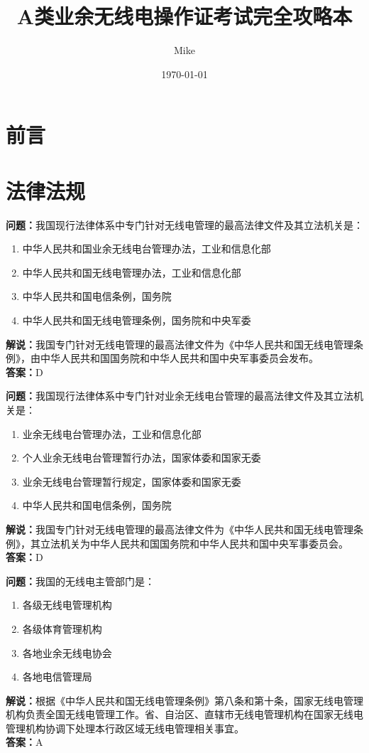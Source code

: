 \documentclass{ctexbook}%
\title{A类业余无线电操作证考试完全攻略本}%
\author{Mike}%
\date{\today}%
\begin{document}

\maketitle%
\tableofcontents%

\chapter*{前言}

\chapter{法律法规}

\textbf{问题：}我国现行法律体系中专门针对无线电管理的最高法律文件及其立法机关是：
\begin{enumerate}[label=\Alph*), leftmargin=3em]
\item 中华人民共和国业余无线电台管理办法，工业和信息化部
\item 中华人民共和国无线电管理办法，工业和信息化部
\item 中华人民共和国电信条例，国务院
\item 中华人民共和国无线电管理条例，国务院和中央军委
\end{enumerate}
\textbf{解说：}我国专门针对无线电管理的最高法律文件为《中华人民共和国无线电管理条例》，由中华人民共和国国务院和中华人民共和国中央军事委员会发布。\\
\textbf{答案：}D

\textbf{问题：}我国现行法律体系中专门针对业余无线电台管理的最高法律文件及其立法机关是：
\begin{enumerate}[label=\Alph*), leftmargin=3em]
\item 业余无线电台管理办法，工业和信息化部
\item 个人业余无线电台管理暂行办法，国家体委和国家无委
\item 业余无线电台管理暂行规定，国家体委和国家无委
\item 中华人民共和国电信条例，国务院
\end{enumerate}
\textbf{解说：}我国专门针对无线电管理的最高法律文件为《中华人民共和国无线电管理条例》，其立法机关为中华人民共和国国务院和中华人民共和国中央军事委员会。\\
\textbf{答案：}D

\textbf{问题：}我国的无线电主管部门是：
\begin{enumerate}[label=\Alph*), leftmargin=3em]
\item 各级无线电管理机构
\item 各级体育管理机构
\item 各地业余无线电协会
\item 各地电信管理局
\end{enumerate}
\textbf{解说：}根据《中华人民共和国无线电管理条例》第八条和第十条，国家无线电管理机构负责全国无线电管理工作。省、自治区、直辖市无线电管理机构在国家无线电管理机构协调下处理本行政区域无线电管理相关事宜。\\
\textbf{答案：}A
\end{document}
